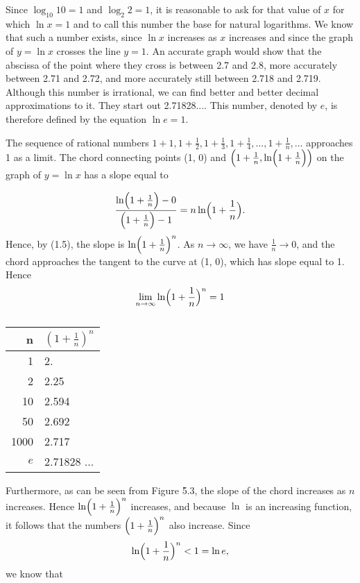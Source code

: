 Since $\log_{10} 10 = 1$ and $\log_{2}2 = 1$, it is reasonable to ask for that value of $x$ for which $\ln x = 1$ and to call this number the base for natural logarithms. We know that such a number exists, since $\ln x$ increases as $x$ increases and since the graph of $y = \ln x$ crosses the line $y = 1$. An accurate graph would show that the abscissa of the point where they cross is between 2.7 and 2.8, more accurately between 2.71 and 2.72, and more accurately still between 2.718 and 2.719. Although this number is irrational, we can find better and better decimal approximations to it. They start out 2.71828.... This number, denoted by $e$, is
therefore defined by the equation $\ln e = 1$.

The sequence of rational numbers $1 + 1, 1 + \frac{1}{2}, 1 + \frac{1}{3}, 1 + \frac{1}{4}, ... , 1 + \frac{1}{n}, . . .$ approaches 1 as a limit. The chord connecting points (1, 0) and $\Bigl( 1 + \frac{1}{n}, \ln \Bigl( 1 + \frac{1}{n} \Bigr) \Bigr)$ on the graph of $y = \ln x$ has a slope equal to

$$
\frac{\ln \Bigl( 1 + \frac{1}{n} \Bigr) - 0}{\Bigl( 1 + \frac{1}{n} \Bigr) - 1} = n \ln \Bigl( 1 + \frac{1}{n} \Bigr).
$$
\noindent Hence, by (1.5), the slope is $\ln \Bigl( 1 + \frac{1}{n} \Bigr)^n$. As $n \rightarrow \infty$, we have $\frac{1}{n} \rightarrow 0$, and the chord approaches the tangent to the curve at (1, 0), which has slope equal to 1. Hence
$$
\lim_{n \rightarrow \infty} \ln \Bigl (1 + \frac{1}{n} \Bigr)^{n} =  1
$$

\medskip
\begin{table}
\centering
\begin{tabular}{r|l} \hline
n       & $(1 + \frac{1}{n})^n$ \\ \hline
1       & 2.        \\
2       & 2.25    \\
10     & 2.594  \\
50     & 2.692  \\
1000 & 2.717        \\ \hline
$e$   & 2.71828 ...\\ \hline
\end{tabular}
\label{table 5.1}
\caption{}
\end{table}
\medskip
 

\noindent Furthermore, as can be seen from Figure \f{5.3}, the slope of the chord increases as $n$ increases. Hence $\ln \Bigl(1 + \frac{1}{n} \Bigr)^{n}$ increases, and because $\ln$ is an increasing function,  it follows that the numbers $\Bigl( 1 + \frac{1}{n} \Bigr)^{n}$ also increase. Since
$$
\ln \Bigl(1 + \frac{1}{n} \Bigr)^{n}  < 1 = \ln e, 
$$
we know that

